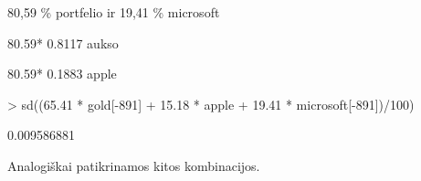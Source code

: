 \documentclass[12pt, a14paper, lithuanian]{article}
\begin{document}
80,59 \% portfelio ir 19,41 \% microsoft

80.59* 0.8117 aukso

80.59* 0.1883 apple
\begin{Schunk}
\begin{Sinput}
> sd((65.41 * gold[-891] + 15.18 * apple + 19.41 * microsoft[-891])/100)
\end{Sinput}
\begin{Soutput}
[1] 0.009586881
\end{Soutput}
\end{Schunk}

Analogiškai patikrinamos kitos kombinacijos.

\begin{comment}
II variantas

\begin{Schunk}
\begin{Sinput}
> folio = 0.7492 * microsoft[-891] + 0.2508 * apple
> (var(folio) - cor(folio, gold[-891]) * sd(gold) * sd(folio))/(var(gold) + 
+     +var(folio) - 2 * cor(folio, gold[-891]) * sd(gold) * sd(folio))
\end{Sinput}
\begin{Soutput}
[1] 0.6904081
\end{Soutput}
\end{Schunk}

69.04 \% aukso ir 30.96 \% folio

30.96* 0.7492 = 23.19523 \% microsoft

30.96* 0.2508 = 7.764768 \% apple
\begin{Schunk}
\begin{Sinput}
> sd((23.19523 * microsoft[-891] + 7.764768 * apple + 69.04 * gold[-891])/100)
\end{Sinput}
\begin{Soutput}
[1] 0.009427794
\end{Soutput}
\end{Schunk}

III variantas


\begin{Schunk}
\begin{Sinput}
> folio = 0.2888 * microsoft + gold * 0.7112
> (var(folio) - cor(folio[-891], apple) * sd(apple) * sd(folio))/(var(apple) + 
+     var(folio) - 2 * cor(folio[-891], apple) * sd(apple) * sd(folio))
\end{Sinput}
\begin{Soutput}
[1] 0.06478507
\end{Soutput}
\end{Schunk}



\end{comment}
\end{document}
